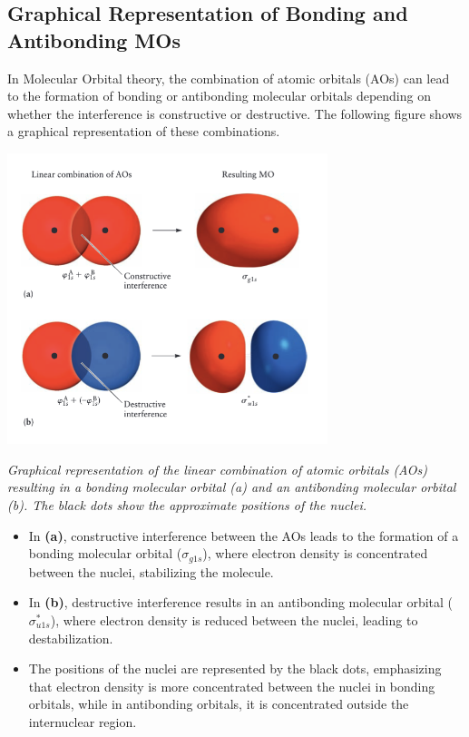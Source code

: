 \documentclass{report}
\begin{document}
\subsection{Graphical Representation of Bonding and Antibonding MOs}

In Molecular Orbital theory, the combination of atomic orbitals (AOs) can lead to the formation of bonding or antibonding molecular orbitals depending on whether the interference is constructive or destructive. The following figure shows a graphical representation of these combinations.

\begin{center}
	\includegraphics[width=0.7\textwidth]{4.png}
\end{center}
\textit{Graphical representation of the linear combination of atomic orbitals (AOs) resulting in a bonding molecular orbital (a) and an antibonding molecular orbital (b). The black dots show the approximate positions of the nuclei.}

\begin{itemize}
	\item In \textbf{(a)}, constructive interference between the AOs leads to the formation of a bonding molecular orbital ($\sigma_{g1s}$), where electron density is concentrated between the nuclei, stabilizing the molecule.

	\item In \textbf{(b)}, destructive interference results in an antibonding molecular orbital ($\sigma^*_{u1s}$), where electron density is reduced between the nuclei, leading to destabilization.

	\item The positions of the nuclei are represented by the black dots, emphasizing that electron density is more concentrated between the nuclei in bonding orbitals, while in antibonding orbitals, it is concentrated outside the internuclear region.
\end{itemize}
\end{document}
